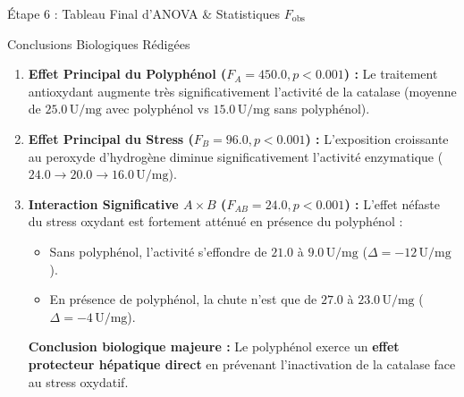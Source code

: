 \documentclass[11pt,a4paper]{article}
\begin{document}
\begin{stepbox}{Étape 6 : Tableau Final d'ANOVA \& Statistiques $F_{\text{obs}}$}
\begin{center}
\end{center}
\end{stepbox}

\begin{takeawaybox}{Conclusions Biologiques Rédigées}
\begin{enumerate}[leftmargin=*, label=\faCheckCircle\ \textbf{\arabic*.}]
  \item \textbf{Effet Principal du Polyphénol ($F_A = 450.0, p < 0.001$) :} Le traitement antioxydant augmente très significativement l'activité de la catalase (moyenne de $25.0\,\text{U/mg}$ avec polyphénol vs $15.0\,\text{U/mg}$ sans polyphénol).
  \item \textbf{Effet Principal du Stress ($F_B = 96.0, p < 0.001$) :} L'exposition croissante au peroxyde d'hydrogène diminue significativement l'activité enzymatique ($24.0 \rightarrow 20.0 \rightarrow 16.0\,\text{U/mg}$).
  \item \textbf{Interaction Significative $A \times B$ ($F_{AB} = 24.0, p < 0.001$) :} L'effet néfaste du stress oxydant est fortement atténué en présence du polyphénol :
  \begin{itemize}
    \item Sans polyphénol, l'activité s'effondre de $21.0$ à $9.0\,\text{U/mg}$ ($\Delta = -12\,\text{U/mg}$).
    \item En présence de polyphénol, la chute n'est que de $27.0$ à $23.0\,\text{U/mg}$ ($\Delta = -4\,\text{U/mg}$).
  \end{itemize}
  \textbf{Conclusion biologique majeure :} Le polyphénol exerce un \textbf{effet protecteur hépatique direct} en prévenant l'inactivation de la catalase face au stress oxydatif.
\end{enumerate}
\end{takeawaybox}
\end{document}
